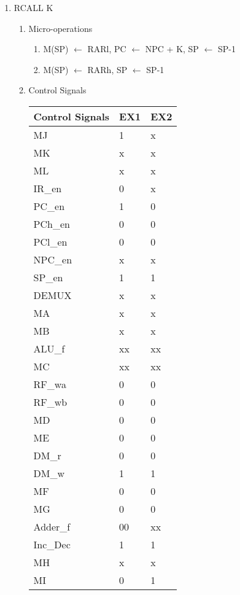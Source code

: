 \documentclass[12pt,letterpaper]{article}
\begin{document}
\begin{enumerate}
    \item RCALL K
    \begin{enumerate}
        \item Micro-operations \\
        \begin{enumerate}[i]
            \item M(SP) $\leftarrow$ RARl, PC $\leftarrow$ NPC + K, SP $\leftarrow$ SP-1
            \item M(SP) $\leftarrow$ RARh, SP $\leftarrow$ SP-1
        \end{enumerate}

        \item Control Signals\\
            \begin{tabular}{l l l}
                 Control Signals & EX1 & EX2 \\
                 \hline
                 MJ & 1 & x \\
                 MK & x & x \\
                 ML & x & x \\
                 IR\_en & 0 & x \\
                 PC\_en & 1 & 0 \\
                 PCh\_en & 0 & 0 \\
                 PCl\_en & 0 & 0 \\
                 NPC\_en & x & x \\
                 SP\_en & 1 & 1 \\
                 DEMUX & x & x \\
                 MA & x & x \\
                 MB & x & x \\
                 ALU\_f & xx & xx \\
                 MC & xx & xx \\
                 RF\_wa & 0 & 0 \\
                 RF\_wb & 0 & 0 \\
                 MD & 0 & 0 \\
                 ME & 0 & 0 \\
                 DM\_r & 0 & 0 \\
                 DM\_w & 1 & 1 \\
                 MF & 0 & 0 \\
                 MG & 0 & 0 \\
                 Adder\_f & 00 & xx \\
                 Inc\_Dec & 1 & 1 \\
                 MH & x & x \\
                 MI & 0 & 1 \\
            \end{tabular}


\end{enumerate}
\end{enumerate}
\end{document}
